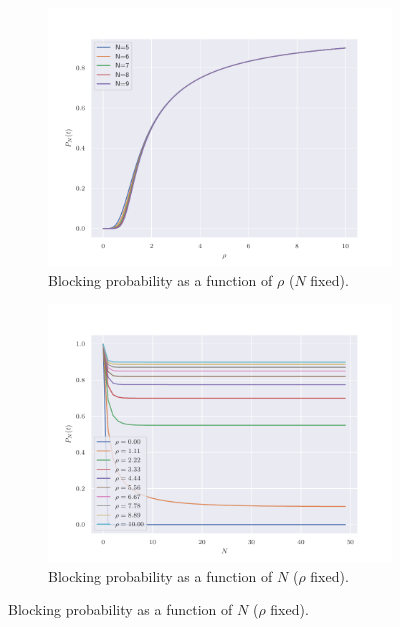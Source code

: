 \documentclass[11pt, a4paper]{report}
\begin{document}
\begin{figure}
    \begin{subfigure}[b]{0.55\textwidth}
        \centering
        \includegraphics[width=\textwidth]{plots/blockProb_Nfix.pdf}
        \caption{Blocking probability as a function of $\rho$ ($N$ fixed).}
        \label{fig:blkprob_N}
    \end{subfigure}
    \hfill
    \begin{subfigure}[b]{0.55\textwidth}
        \centering
        \includegraphics[width=\textwidth]{plots/blockProb_rhofix.pdf}
        \caption{Blocking probability as a function of $N$ ($\rho$ fixed).}
        \label{fig:blkprob_rho}
    \end{subfigure}
    \label{fig:blk_prob}
\end{figure}
\end{document}
